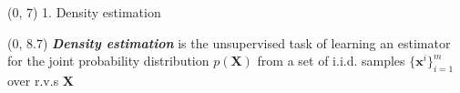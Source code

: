 \documentclass[final]{beamer}
\begin{document}
\begin{frame}{}
\begin{textblock}{30}
\begin{minipage}[t]{15cm}
    \end{minipage}
  \end{textblock}
  
  
  \begin{textblock}{17.5}(0, 7)
    1. Density estimation
  \end{textblock}

  \begin{textblock}{17.5}(0, 8.7)
    \small
        \emph{\textbf{Density estimation}} is the unsupervised task of
    learning an estimator for the joint probability distribution
    $p(\mathbf{X})$ from a set of i.i.d. samples $\{\mathbf
    x^i\}_{i=1}^m$ over r.v.s $\mathbf{X}$\\[20pt]
    

\end{textblock}
\end{frame}
\end{document}
